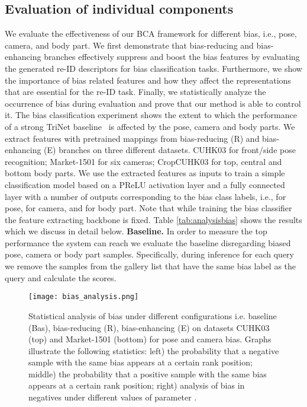 \documentclass[10pt,twocolumn,letterpaper]{article}
\begin{document}
\subsection{Evaluation of individual components}
\noindent We evaluate the effectiveness of our BCA framework for different bias, i.e., pose, camera, and body part.
We first demonstrate that {bias-reducing} and {bias-enhancing} branches effectively suppress and boost the bias features by evaluating the generated re-ID descriptors for bias classification tasks.
Furthermore, we show the importance of bias related features and how they affect the  representations that are essential for the re-ID task.  
Finally, we statistically analyze the occurrence of bias during evaluation and prove that our method is able to control it. 
The bias classification experiment  shows the extent to which the performance of a strong TriNet baseline~\cite{hermans2017defense} is affected by the pose, camera and body parts. 
We extract features with pretrained mappings  from bias-reducing (R) and bias-enhancing (E) branches on three different datasets. CUHK03 for front/side pose recognition; Market-1501 for six cameras; CropCUHK03 for top, central and bottom body parts.
We use the extracted features as inputs to train a simple classification model based on a PReLU activation layer and a fully connected layer with a number of outputs corresponding to the bias class labels, i.e.,  for pose,  for camera, and  for body part. Note that while training the bias classifier the feature extracting backbone is fixed.
Table \ref{tab:analysisbias} shows the results which we discuss in detail below.  
\newline
\noindent\textbf{Baseline.} In order to measure the top performance the system can reach  we evaluate the baseline disregarding biased pose, camera or body part  samples. Specifically, during inference for each query we remove  the samples  from the gallery list that have the same bias label as the query and calculate the scores. 
\begin{figure*}[h]
\centering
{\texttt{[image: bias\_analysis.png]}}
   \caption{Statistical analysis of bias under different configurations i.e. baseline (Bas), bias-reducing (R), bias-enhancing (E) on datasets CUHK03 (top) and Market-1501 (bottom) for pose and camera bias. Graphs illustrate the following statistics: left) the probability that a negative sample with the same bias appears at a certain rank position; middle) the probability that a positive sample with the same bias appears at a certain rank position; right) analysis of bias in negatives under different values of parameter .}
\label{fig:statistic}
\end{figure*}
\end{document}
